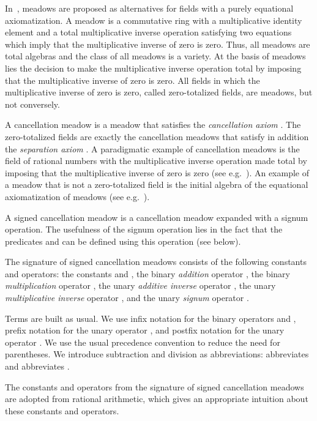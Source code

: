\documentclass{llncs}
\begin{document}
In~\cite{BT07a}, meadows are proposed as alternatives for fields with a
purely equational axiomatization.
A meadow is a commutative ring with a multiplicative identity element
and a total multiplicative inverse operation satisfying two equations
which imply that the multiplicative inverse of zero is zero.
Thus, all meadows are total algebras and the class of all meadows is a 
variety.
At the basis of meadows lies the decision to make the multiplicative 
inverse operation total by imposing that the multiplicative inverse of 
zero is zero.
All fields in which the multiplicative inverse of zero is zero, called
zero-totalized fields, are meadows, but not conversely.

A cancellation meadow is a meadow that satisfies the 
\emph{cancellation axiom} 
.
The zero-totalized fields are exactly the cancellation meadows that
satisfy in addition the \emph{separation axiom} .
A paradigmatic example of cancellation meadows is the field of rational
numbers with the multiplicative inverse operation made total by imposing
that the multiplicative inverse of zero is zero (see e.g.~\cite{BT07a}).
An example of a meadow that is not a zero-totalized field is the initial
algebra of the equational axiomatization of meadows 
(see e.g.~\cite{BHT09a}).

A signed cancellation meadow is a cancellation meadow expanded with a
signum operation.
The usefulness of the signum operation lies in the fact that the 
predicates  and  can be defined using this operation 
(see below).

The signature of signed cancellation meadows consists of the following
constants and operators:
the constants  and ,
the binary \emph{addition} operator  {},
the binary \emph{multiplication} operator ,
the unary \emph{additive inverse} operator ,
the unary \emph{multiplicative inverse} operator , and
the unary \emph{signum} operator .

Terms are built as usual.
We use infix notation for the binary operators  and
, prefix notation for the unary operator , and postfix
notation for the unary operator .
We use the usual precedence convention to reduce the need for
parentheses.
We introduce subtraction and division as abbreviations:
 abbreviates  and
 abbreviates .

The constants and operators from the signature of signed cancellation
meadows are adopted from rational arithmetic, which gives an appropriate
intuition about these constants and operators.
\end{document}
